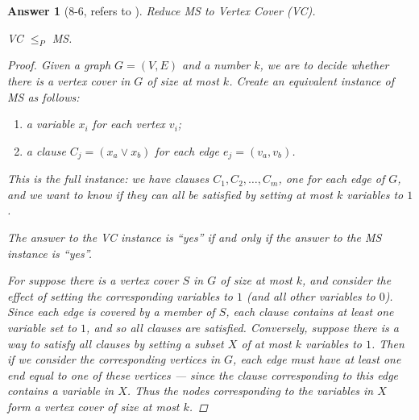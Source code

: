 \documentclass[11pt]{article}
\theoremstyle{numberplain}
\theoremstyle{nonumberplain}
\newtheorem{proof}{Proof}
\newtheorem{ans}{Answer}
\newcommand{\0}{{\mathbf{0}}}
\begin{document}
\begin{ans}[8-6, refers to \cite{solcornell}]
Reduce MS to Vertex Cover (VC).


\begin{State}[Claim 1] 
VC $\leq_P$ MS.
\end{State}
\begin{proof}
Given a graph $G = (V,E)$ and a number $k$, we are to decide whether there is a vertex cover in $G$ of size at most $k$. Create an equivalent instance of MS as follows:
\begin{enumerate}
\item a variable $x_i$ for each vertex $v_i$;
\item a clause $C_j = (x_a \vee x_b)$ for each edge $e_j = (v_a, v_b)$.
\end{enumerate}

This is the full instance:
we have clauses $C_1, C_2, \ldots, C_m$, 
one for each edge of $G$, and we want to know
if they can all be satisfied by setting at most
$k$ variables to $1$.
\par 
\begin{State}[Claim 2]
The answer to the VC instance is ``yes''
if and only if the answer to the MS instance is ``yes''.
\end{State}
For suppose there is a vertex cover $S$ in $G$ of size at most $k$,
and consider the effect of setting the corresponding
variables to $1$ (and all other variables to $0$).
Since each edge is covered by a member of $S$, 
each clause contains at least one variable set to $1$,
and so all clauses are satisfied.
Conversely, suppose there is a way to satisfy 
all clauses by setting a subset $X$ of at most $k$ variables to $1$.
Then if we consider the corresponding vertices in $G$,
each edge must have at least one end equal to one of these vertices ---
since the clause corresponding to this edge contains a
variable in $X$.
Thus the nodes corresponding to the variables in $X$
form a vertex cover of size at most $k$.
\end{proof}
\end{ans}
\end{document}
